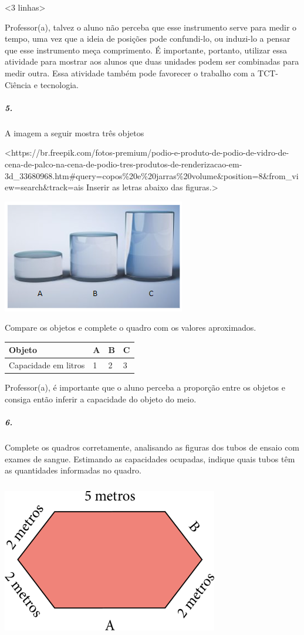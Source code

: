\textless{}3 linhas\textgreater{}

Professor(a), talvez o aluno não perceba que esse instrumento serve para
medir o tempo, uma vez que a ideia de posições pode confundi-lo, ou
induzi-lo a pensar que esse instrumento meça comprimento. É importante,
portanto, utilizar essa atividade para mostrar aos alunos que duas
unidades podem ser combinadas para medir outra. Essa atividade também
pode favorecer o trabalho com a TCT- Ciência e tecnologia.

\subparagraph{5.}\label{section-32}

A imagem a seguir mostra três objetos

\textless{}https://br.freepik.com/fotos-premium/podio-e-produto-de-podio-de-vidro-de-cena-de-palco-na-cena-de-podio-tres-produtos-de-renderizacao-em-3d\_33680968.htm\#query=copos\%20e\%20jarras\%20volume\&position=8\&from\_view=search\&track=ais
Inserir as letras abaixo das figuras.\textgreater{}

\includegraphics[width=3.14583in,height=1.94792in]{media/image46.png}

Compare os objetos e complete o quadro com os valores aproximados.

\begin{longtable}[]{@{}llll@{}}
\toprule
Objeto & A & B & C\tabularnewline
\midrule
\endhead
Capacidade em litros & 1 & 2 & 3\tabularnewline
\bottomrule
\end{longtable}

Professor(a), é importante que o aluno perceba a proporção entre os
objetos e consiga então inferir a capacidade do objeto do meio.

\subparagraph{6.}\label{section-33}

Complete os quadros corretamente, analisando as figuras dos tubos de
ensaio com exames de sangue. Estimando as capacidades ocupadas, indique
quais tubos têm as quantidades informadas no quadro.

\includegraphics[width=3.71875in,height=2.70833in]{media/image47.png}


